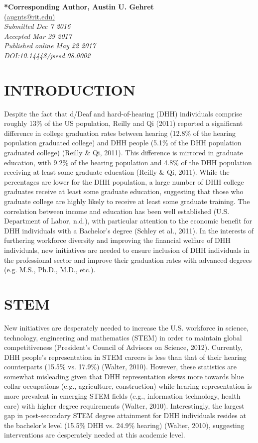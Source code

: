 \documentclass[11.5pt]{sig-alternate} %
\begin{document}
\textbf{*Corresponding Author, Austin U. Gehret}\\
\href{mailto: augnts@rit.edu }{(augnts@rit.edu)} \\
\textit{Submitted Dec 7 2016 }\\
\textit{Accepted Mar 29 2017} \\
\textit{Published online May 22 2017} \\
\textit{DOI:10.14448/jsesd.08.0002} \\
\pagebreak
\clearpage
\begin{large}
  
\section*{INTRODUCTION}

Despite the fact that d/Deaf and hard-of-hearing (DHH) individuals comprise roughly 13\% of the US population, Reilly and Qi (2011) reported a significant difference in college graduation rates between hearing (12.8\% of the hearing population graduated college) and DHH people (5.1\% of the DHH population graduated college) (Reilly \& Qi, 2011). This difference is mirrored in graduate education, with 9.2\% of the hearing population and 4.8\% of the DHH population receiving at least some graduate education (Reilly \& Qi, 2011). While the percentages are lower for the DHH population, a large number of DHH college graduates receive at least some graduate education, suggesting that those who graduate college are highly likely to receive at least some graduate training. The correlation between income and education has been well established (U.S. Department of Labor, n.d.), with particular attention to the economic benefit for DHH individuals with a Bachelor’s degree (Schley et al., 2011). In the interests of furthering workforce diversity and improving the financial welfare of DHH individuals, new initiatives are needed to ensure inclusion of DHH individuals in the professional sector and improve their graduation rates with advanced degrees (e.g. M.S., Ph.D., M.D., etc.). 

\section*{STEM}

New initiatives are desperately needed to increase the U.S. workforce in science, technology, engineering and mathematics (STEM) in order to maintain global competitiveness (President’s Council of Advisors on Science, 2012). Currently, DHH people’s representation in STEM careers is less than that of their hearing counterparts (15.5\% vs. 17.9\%) (Walter, 2010). However, these statistics are somewhat misleading given that DHH representation skews more towards blue collar occupations (e.g., agriculture, construction) while hearing representation is more prevalent in emerging STEM fields (e.g., information technology, health care) with higher degree requirements (Walter, 2010). Interestingly, the largest gap in post-secondary STEM degree attainment for DHH individuals resides at the bachelor’s level (15.5\% DHH vs. 24.9\% hearing) (Walter, 2010), suggesting interventions are desperately needed at this academic level.


\end{large}
\end{document}
